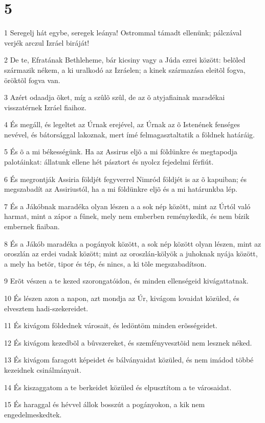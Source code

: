 \chapter{5}

\par 1 Seregelj hát egybe, seregek leánya! Ostrommal támadt ellenünk; pálczával verjék arczul Izráel biráját!
\par 2 De te, Efratának Bethleheme, bár kicsiny vagy a Júda ezrei között: belõled származik nékem, a ki uralkodó az Izráelen; a kinek származása eleitõl fogva, öröktõl fogva van.
\par 3 Azért odaadja õket, míg a szûlõ szûl,  de az õ atyjafiainak maradékai visszatérnek Izráel fiaihoz.
\par 4 És megáll, és legeltet az Úrnak erejével, az Úrnak az õ Istenének fenséges nevével, és bátorsággal lakoznak, mert ímé felmagasztaltatik a földnek határáig.
\par 5 És õ a mi békességünk. Ha az Assirus eljõ a mi földünkre és megtapodja palotáinkat: állatunk ellene hét pásztort és nyolcz fejedelmi férfiút.
\par 6 És megrontják Assiria földjét fegyverrel Nimród földjét is az õ kapuiban; és megszabadít az Assiriustól, ha a mi földünkre eljõ és a mi határunkba lép.
\par 7 És a Jákóbnak maradéka olyan lészen a a sok nép között, mint az Úrtól való harmat, mint a zápor a fûnek, mely nem emberben reménykedik, és nem bízik embernek fiaiban.
\par 8 És a Jákób maradéka a pogányok között, a sok nép között olyan lészen, mint az oroszlán az erdei vadak között; mint az oroszlán-kölyök a juhoknak nyája között, a mely ha betör, tipor és tép, és nincs, a ki tõle megszabadítson.
\par 9 Erõt vészen a te kezed szorongatóidon, és minden ellenségeid kivágattatnak.
\par 10 És lészen azon a napon, azt mondja az Úr, kivágom lovaidat közüled, és elvesztem hadi-szekereidet.
\par 11 És kivágom földednek városait, és ledöntöm minden erõsségeidet.
\par 12 És kivágom kezedbõl a bûvszereket, és szemfényvesztõid nem lesznek néked.
\par 13 És kivágom faragott képeidet és bálványaidat közüled, és nem imádod többé kezeidnek csinálmányait.
\par 14 És kiszaggatom a te berkeidet közüled és elpusztítom a te városaidat.
\par 15 És haraggal és hévvel állok bosszút a pogányokon, a kik nem engedelmeskedtek.

